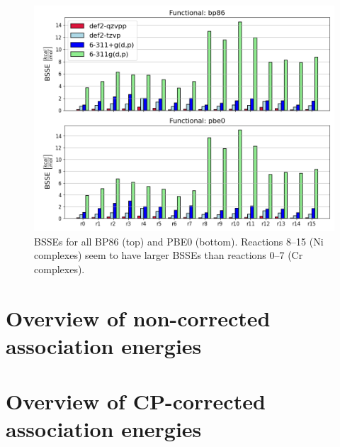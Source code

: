 \documentclass[11pt,a4paper]{article}
\begin{document}
\begin{figure}[H]
	\centering
	\includegraphics[width = \textwidth]{../figs/bsse.png}
	\caption{BSSEs for all BP86 (top) and PBE0 (bottom). Reactions 8--15 (Ni complexes) seem to have larger BSSEs than reactions 0--7 (Cr complexes).}
	\label{fig: bsse overview}
\end{figure}

\section*{Overview of non-corrected association energies}

\section*{Overview of CP-corrected association energies}
\end{document}
